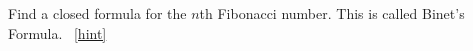 \documentclass{book}
\begin{document}
\setcounter{project}{150}
\addtocounter{project}{-1}
\begin{activity}[]\label{act-binet}
\hypertarget{p-1008}{}%
Find a closed formula for the \(n\)th Fibonacci number.  This is called Binet's Formula.%
~\hfill{\tiny\hyperlink{a-150}{[hint]}\hypertarget{q-150}{}}\end{activity}
\end{document}
